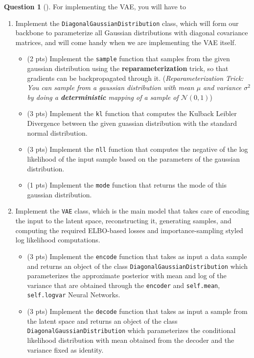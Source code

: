 \documentclass[12pt]{article}
\theoremstyle{definition}
\newtheorem{exercise}{Question}%
\begin{document}
\begin{exercise}[]
For implementing the VAE, you will have to
\begin{enumerate}
    \item Implement the \texttt{DiagonalGaussianDistribution} class, which will form our backbone to parameterize all Gaussian distributions with diagonal covariance matrices, and will come handy when we are implementing the VAE itself.
    \begin{itemize}
        \item (2 pts) Implement the \texttt{sample} function that samples from the given gaussian distribution using the \textbf{reparameterization} trick, so that gradients can be backpropagated through it. (\textit{Reparameterization Trick: You can sample from a gaussian distribution with mean $\mu$ and variance $\sigma^2$ by doing a \textbf{deterministic} mapping of a sample of $\mathcal{N}(0, 1)$})
        \item (3 pts) Implement the \texttt{kl} function that computes the Kulback Leibler Divergence between the given guassian distribution with the standard normal distribution.
        \item (3 pts) Implement the \texttt{nll} function that computes the negative of the log likelihood of the input sample based on the parameters of the gaussian distribution.
        \item (1 pts) Implement the \texttt{mode} function that returns the mode of this gaussian distribution.
    \end{itemize}
    \item Implement the \texttt{VAE} class, which is the main model that takes care of encoding the input to the latent space, reconstructing it, generating samples, and computing the required ELBO-based losses and importance-sampling styled log likelihood computations.
    \begin{itemize}
        \item (3 pts) Implement the \texttt{encode} function that takes as input a data sample and returns an object of the class \texttt{DiagonalGaussianDistribution} which parameterizes the approximate posterior with mean and log of the variance that are obtained through the \texttt{encoder} and \texttt{self.mean}, \texttt{self.logvar} Neural Networks.
        \item (3 pts) Implement the \texttt{decode} function that takes as input a sample from the latent space and returns an object of the class \texttt{DiagonalGaussianDistribution} which parameterizes the conditional likelihood distribution with mean obtained from the decoder and the variance fixed as identity. 

\end{itemize}
\end{enumerate}
\end{exercise}
\end{document}
